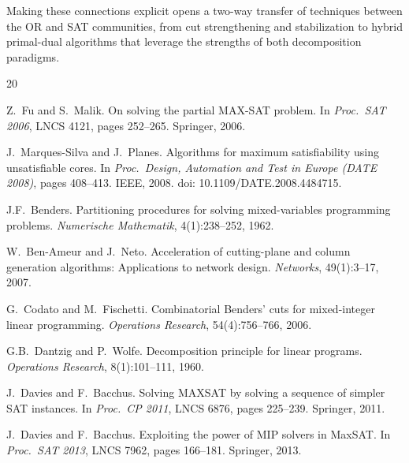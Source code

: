 \documentclass[11pt,a4paper]{article}
\begin{document}
Making these connections explicit opens a two-way transfer of techniques
between the OR and SAT communities, from cut strengthening and stabilization
to hybrid primal-dual algorithms that leverage the strengths of both
decomposition paradigms.



\begin{thebibliography}{20}

Z.~Fu and S.~Malik.
\newblock On solving the partial {MAX-SAT} problem.
\newblock In \emph{Proc.\ SAT 2006}, LNCS 4121, pages 252--265. Springer, 2006.

J.~Marques-Silva and J.~Planes.
\newblock Algorithms for maximum satisfiability using unsatisfiable cores.
\newblock In \emph{Proc.\ Design, Automation and Test in Europe (DATE 2008)},
  pages 408--413. IEEE, 2008.
\newblock doi: 10.1109/DATE.2008.4484715.

J.F.~Benders.
\newblock Partitioning procedures for solving mixed-variables programming
  problems.
\newblock \emph{Numerische Mathematik}, 4(1):238--252, 1962.

W.~Ben-Ameur and J.~Neto.
\newblock Acceleration of cutting-plane and column generation algorithms:
  Applications to network design.
\newblock \emph{Networks}, 49(1):3--17, 2007.

G.~Codato and M.~Fischetti.
\newblock Combinatorial {B}enders' cuts for mixed-integer linear programming.
\newblock \emph{Operations Research}, 54(4):756--766, 2006.

G.B.~Dantzig and P.~Wolfe.
\newblock Decomposition principle for linear programs.
\newblock \emph{Operations Research}, 8(1):101--111, 1960.

J.~Davies and F.~Bacchus.
\newblock Solving {MAXSAT} by solving a sequence of simpler {SAT} instances.
\newblock In \emph{Proc.\ CP 2011}, LNCS 6876, pages 225--239. Springer, 2011.

J.~Davies and F.~Bacchus.
\newblock Exploiting the power of {MIP} solvers in {MaxSAT}.
\newblock In \emph{Proc.\ SAT 2013}, LNCS 7962, pages 166--181. Springer, 2013.


\end{thebibliography}
\end{document}
